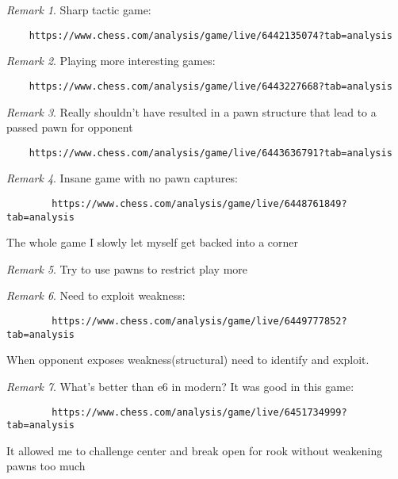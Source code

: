 \documentclass[11pt]{article}
\theoremstyle{remark}
\newtheorem{remark}{Remark}
\begin{document}
\begin{remark}
	Sharp tactic game:
	\begin{verbatim}
	https://www.chess.com/analysis/game/live/6442135074?tab=analysis
	\end{verbatim}
\end{remark}

\begin{remark}
	Playing more interesting games:
	\begin{verbatim}
	https://www.chess.com/analysis/game/live/6443227668?tab=analysis
	\end{verbatim}
\end{remark}

\begin{remark}
	Really shouldn't have resulted in a pawn structure that lead to a passed pawn for opponent
	\begin{verbatim}
	https://www.chess.com/analysis/game/live/6443636791?tab=analysis
	\end{verbatim}
\end{remark}

\begin{remark}
	Insane game with no pawn captures:
	\begin{verbatim}
		https://www.chess.com/analysis/game/live/6448761849?tab=analysis
	\end{verbatim}

	The whole game I slowly let myself get backed into a corner
\end{remark}

\begin{remark}
	Try to use pawns to restrict play more
\end{remark}

\begin{remark}
	Need to exploit weakness:
	\begin{verbatim}
		https://www.chess.com/analysis/game/live/6449777852?tab=analysis
	\end{verbatim}

	When opponent exposes weakness(structural) need to identify and exploit.
\end{remark}

\begin{remark}
	What's better than e6 in modern?
	It was good in this game:
	\begin{verbatim}
		https://www.chess.com/analysis/game/live/6451734999?tab=analysis
	\end{verbatim}
	It allowed me to challenge center and break open for rook without weakening pawns too much
\end{remark}
\end{document}
